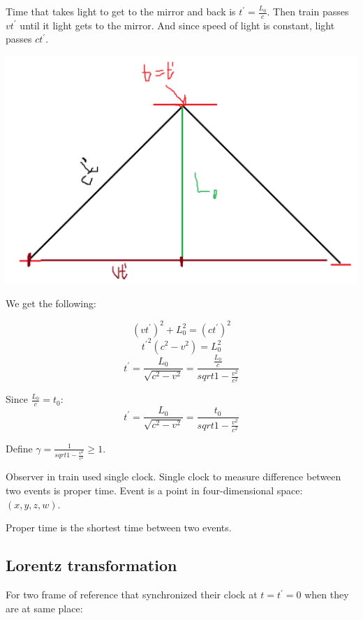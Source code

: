 Time that takes light to get to the mirror and back is $t^\prime = \frac{L_0}{c}$. Then train passes $vt^\prime$ until it light gets to the mirror. And since speed of light is constant, light passes $ct^\prime$.
\begin{center}
	\includegraphics[width=\linewidth]{./lect20/pic4.png}
\end{center}

We get the following:

$$\left(vt^\prime\right)^2 + L_0^2 = \left(ct^\prime\right)^2$$
$${t^\prime}^2 \left(c^2 - v^2\right) = L_0^2$$
$$t^\prime = \frac{L_0}{\sqrt{c^2-v^2}} = \frac{\frac{L_0}{c}}{sqrt{1-\frac{v^2}{c^2}}}$$

Since $\frac{L_0}{c} = t_0$:
$$t^\prime = \frac{L_0}{\sqrt{c^2-v^2}} = \frac{t_0}{sqrt{1-\frac{v^2}{c^2}}}$$

Define $\gamma = \frac{1}{sqrt{1-\frac{v^2}{c^2}}} \geq 1$.


Observer in train used single clock. Single clock to measure difference between two events is proper time. Event is a point in four-dimensional space: $\left( x,y,z,w \right)$. 

Proper time is the shortest time between two events.

\subsection{Lorentz transformation}
For two frame of reference that synchronized their clock at $t=t^\prime=0$ when they are at same place:


